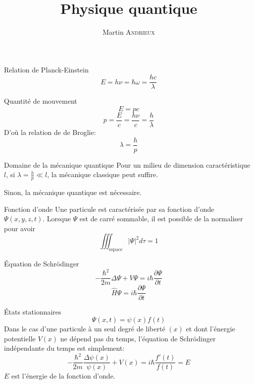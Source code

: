 \documentclass[french, a4paper, 11pt, twocolumn]{article}
\title{Physique quantique}
\author{Martin \textsc{Andrieux}}
\date{}
\begin{document}
\maketitle

\begin{cadre}{Relation de Planck-Einstein}
  \[E = h\nu = \hbar\omega = \dfrac{hc}{\lambda}\]
\end{cadre}

\begin{cadre}{Quantité de mouvement}
  \[E = pc\]
  \[p = \dfrac{E}{c} = \dfrac{h\nu}{c} = \dfrac{h}{\lambda}\]
  D'où la relation de de Broglie:
  \[\lambda = \dfrac{h}{p}\]
\end{cadre}

\begin{cadre}{Domaine de la mécanique quantique}
  Pour un milieu de dimension caractéristique \(l\), si \(\lambda = \frac{h}{p} \ll l\), la mécanique classique peut suffire.

  Sinon, la mécanique quantique est nécessaire.
\end{cadre}

\begin{cadre}{Fonction d'onde}
  Une particule est caractérisée par sa fonction d'onde \(\Psi(x, y, z, t)\).
  Lorsque \(\Psi\) est de carré sommable, il est possible de la normaliser pour avoir
  \[\iiint_{\text{espace}}\lvert\Psi\rvert^{2}d\tau = 1\]
\end{cadre}

\begin{cadre}{Équation de Schrödinger}
  \[-\dfrac{\hbar^{2}}{2m}\Delta\Psi + V\Psi = i\hbar\dfrac{\partial \Psi}{\partial t}\]
  \[\widehat H\Psi = i\hbar\dfrac{\partial \Psi}{\partial t}\]
\end{cadre}
\begin{cadre}{États stationnaires}
  \[\Psi(x, t) = \psi(x)f(t)\]
  Dans le cas d'une particule à un seul degré de liberté \((x)\) et dont l'énergie potentielle \(V(x)\) ne dépend pas du temps, l'équation de Schrödinger indépendante du temps est simplement:
  \[-\dfrac{\hbar^{2}}{2m}\dfrac{\Delta\psi(x)}{\psi(x)} + V(x) = i\hbar\dfrac{f'(t)}{f(t)} = E\]
  \(E\) est l'énergie de la fonction d'onde.
\end{cadre}
\end{document}
